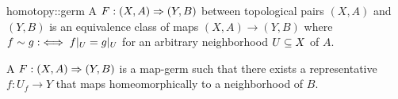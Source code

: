 \begin{mydefinition}{homotopy::germ}{}
    A  $F: (X, A) \Rightarrow{} (Y, B)$ between topological pairs $(X, A)$ and $(Y, B)$ is an equivalence class of maps $(X, A) \to (Y, B)$
    where $f \sim g :\iff f\vert_{U} = g\vert_{U}$ for an arbitrary neighborhood $U \subseteq{} X$ of $A$. 
\end{mydefinition}

\begin{myparagraph}
    A  $F: (X, A) \Rightarrow{} (Y, B)$ is a map-germ
    such that there exists a representative $f: U_f \to Y$ that maps homeomorphically to a neighborhood of $B$.  
\end{myparagraph}